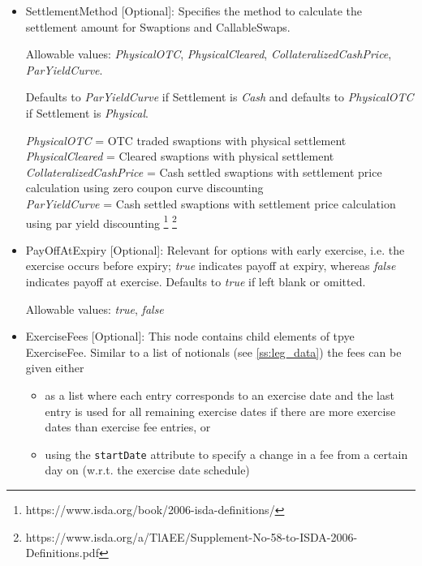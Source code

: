 \begin{itemize}
\item SettlementMethod [Optional]: Specifies the method to calculate the settlement amount for Swaptions and CallableSwaps.

  Allowable values: \emph{PhysicalOTC}, \emph{PhysicalCleared}, \emph{CollateralizedCashPrice},\\ \emph{ParYieldCurve}. 
  
  Defaults to \emph{ParYieldCurve} if Settlement is \emph{Cash} and defaults to \emph{PhysicalOTC} if Settlement is \emph{Physical}.

\emph{PhysicalOTC} = OTC traded swaptions with physical settlement\\
\emph{PhysicalCleared} = Cleared swaptions with physical settlement\\
\emph{CollateralizedCashPrice} = Cash settled swaptions with settlement price calculation using zero coupon curve discounting \\
\emph{ParYieldCurve}  = Cash settled swaptions with settlement price calculation using par yield discounting \footnote{https://www.isda.org/book/2006-isda-definitions/} \footnote{https://www.isda.org/a/TlAEE/Supplement-No-58-to-ISDA-2006-Definitions.pdf} \\

\item PayOffAtExpiry [Optional]: Relevant for options with early
  exercise, i.e. the exercise occurs before expiry; \emph{true}
  indicates payoff at expiry, whereas \emph{false}  indicates payoff
  at exercise. Defaults to \emph{true}  if left blank or omitted. 

Allowable values: \emph{true}, \emph{false} 

\item ExerciseFees [Optional]: This node contains child elements of tpye ExerciseFee. Similar to a list of notionals
  (see \ref{ss:leg_data}) the fees can be given either

  \begin{itemize}
  \item as a list where each entry corresponds to an exercise date and the last entry is used for all remaining exercise
    dates if there are more exercise dates than exercise fee entries, or
  \item using the \verb+startDate+ attribute to specify a change in a fee from a certain day on (w.r.t. the exercise
    date schedule)
  \end{itemize}


\end{itemize}
